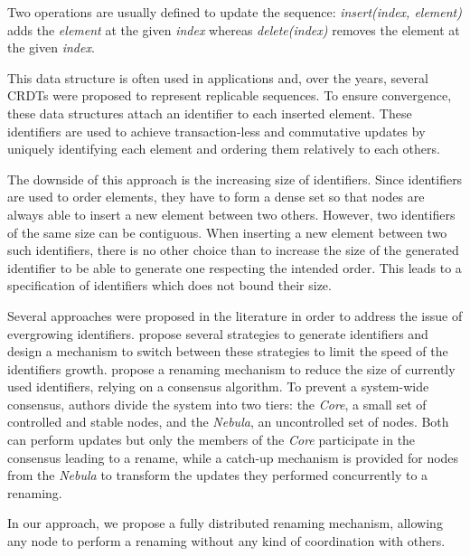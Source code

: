 \documentclass[sigplan]{acmart}
\begin{document}
Two operations are usually defined to update the sequence:
\emph{insert(index, element)} adds the \emph{element} at the given \emph{index}
whereas \emph{delete(index)} removes the element at the given \emph{index}.

This data structure is often used in applications and, over the years, several \acp{CRDT} \cite{shapiro:inria-00177693, WeissICDCS09, AndreCollaborateCom2013} were proposed to represent replicable  sequences. %
To ensure convergence, these data structures attach an identifier to each inserted element.
These identifiers are used to achieve transaction-less and commutative updates by uniquely identifying each element and ordering them relatively to each others.

The downside of this approach is the increasing size of identifiers.
Since identifiers are used to order elements, they have to form a dense set so that nodes are always able to insert a new element between two others.
However, two identifiers of the same size can be contiguous.
When inserting a new element between two such identifiers, there is no other choice than to increase the size of the generated identifier to be able to generate one respecting the intended  order. This leads to a specification of identifiers which does not bound their size.

Several approaches were proposed in the literature in order to address the issue of evergrowing identifiers.
\citet{nedelec_2013_lseq} propose several strategies to generate identifiers and design a mechanism to switch between these strategies to limit the speed of the identifiers growth.
\citet{leia:inria-00397981} propose a renaming mechanism to reduce the size of currently used identifiers, relying on a consensus algorithm.
To prevent a system-wide consensus, authors divide the system into two tiers: the \emph{Core}, a small set of controlled and stable nodes, and the \emph{Nebula}, an uncontrolled set of nodes.
Both can perform updates but only the members of the \emph{Core} participate in the consensus leading to a rename, while a catch-up mechanism is provided for nodes from the \emph{Nebula} to transform the updates they performed concurrently to a renaming.


In our approach, we propose a fully distributed renaming mechanism, allowing any node to perform a renaming without any kind of coordination with others.
\end{document}
